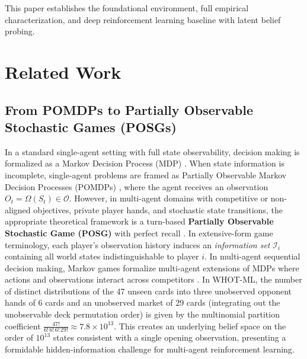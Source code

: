 \documentclass[11pt]{article}
\begin{document}
This paper establishes the foundational environment, full empirical characterization, and deep reinforcement learning baseline with latent belief probing.


\section{Related Work}

\subsection{From POMDPs to Partially Observable Stochastic Games (POSGs)}
In a standard single-agent setting with full state observability, decision making is formalized as a Markov Decision Process (MDP) \citep{sutton2018reinforcement}. When state information is incomplete, single-agent problems are framed as Partially Observable Markov Decision Processes (POMDPs) \citep{kaelbling1998planning}, where the agent receives an observation $O_t = \Omega(S_t) \in \mathcal{O}$. However, in multi-agent domains with competitive or non-aligned objectives, private player hands, and stochastic state transitions, the appropriate theoretical framework is a turn-based \textbf{Partially Observable Stochastic Game (POSG)} with perfect recall \citep{hansen2004dynamic}. In extensive-form game terminology, each player's observation history induces an \textit{information set} $\mathcal{I}_i$ containing all world states indistinguishable to player $i$. In multi-agent sequential decision making, Markov games formalize multi-agent extensions of MDPs where actions and observations interact across competitors \citep{littman1994markov}. In WHOT-ML, the number of distinct distributions of the 47 unseen cards into three unobserved opponent hands of 6 cards and an unobserved market of 29 cards (integrating out the unobservable deck permutation order) is given by the multinomial partition coefficient $\frac{47!}{6!\,6!\,6!\,29!} \approx 7.8 \times 10^{13}$. This creates an underlying belief space on the order of $10^{13}$ states consistent with a single opening observation, presenting a formidable hidden-information challenge for multi-agent reinforcement learning.
\end{document}
